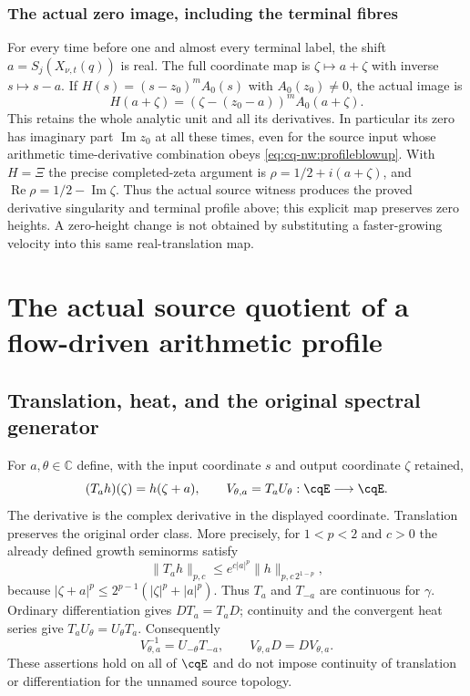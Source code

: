 \subsubsection{The actual zero image, including the terminal fibres}

For every time before one and almost every terminal label, the shift
$a=S_j(X_{\nu,t}(q))$ is real. The full coordinate map is
$\zeta\mapsto a+\zeta$ with inverse $s\mapsto s-a$. If
$H(s)=(s-z_0)^mA_0(s)$ with $A_0(z_0)\ne0$, the actual image is
\[
 H(a+\zeta)=(\zeta-(z_0-a))^mA_0(a+\zeta).
\]
This retains the whole analytic unit and all its derivatives. In
particular its zero has imaginary part $\operatorname{Im}z_0$ at all
these times, even for the source input whose arithmetic time-derivative
combination obeys \eqref{eq:cq-nw:profileblowup}. With $H=\Xi$ the precise
completed-zeta argument is $\rho=1/2+i(a+\zeta)$, and
$\operatorname{Re}\rho=1/2-\operatorname{Im}\zeta$. Thus the actual
source witness produces the proved derivative singularity and terminal
profile above; this explicit map preserves zero heights. A zero-height
change is not obtained by substituting a faster-growing velocity into
this same real-translation map.

\section{The actual source quotient of a flow-driven arithmetic profile}
\label{sec:cq-flow-source-quotient}

\subsection{Translation, heat, and the original spectral generator}

For $a,\theta\in\mathbb C$ define, with the input coordinate $s$ and
output coordinate $\zeta$ retained,
\[
 (T_ah)(\zeta)=h(\zeta+a),\qquad
 V_{\theta,a}=T_aU_\theta:\cqE\longrightarrow\cqE.
\]
The derivative is the complex derivative in the displayed coordinate.
Translation preserves the original order class. More precisely, for
$1<p<2$ and $c>0$ the already defined growth seminorms satisfy
\[
 \|T_ah\|_{p,c}\leq
 e^{c|a|^p}\|h\|_{p,c\,2^{1-p}},
\]
because $|\zeta+a|^p\leq2^{p-1}(|\zeta|^p+|a|^p)$.
Thus $T_a$ and $T_{-a}$ are continuous for $\gamma$. Ordinary
differentiation gives $DT_a=T_aD$; continuity and the convergent
heat series give $T_aU_\theta=U_\theta T_a$. Consequently
\[
 V_{\theta,a}^{-1}=U_{-\theta}T_{-a},\qquad
 V_{\theta,a}D=DV_{\theta,a}.
\]
These assertions hold on all of $\cqE$ and do not impose continuity
of translation or differentiation for the unnamed source topology.

